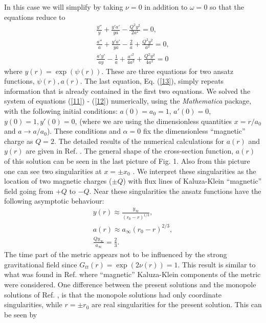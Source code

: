 In this case we will simplify by taking $\nu = 0$ in addition to
$\omega =0$ so that the equations reduce to
\begin{eqnarray} 
\frac{y''}{y} + \frac{y'a'}{ya} - \frac{Q^2 y^2}{2a^2} = 0, 
\label{11} \\
\frac{a''}{a} + \frac{y'a'}{ya} - \frac{2}{a} + 
\frac{Q^2 y^2}{a^2} = 0, 
\label{12} \\
\frac{a'y'}{ay} - \frac{1}{a} + \frac{a'^2}{4a^2} + 
\frac{Q^2y^2}{4a^2} = 0 
\label{13} 
\end{eqnarray} 
where $y(r)=\exp{(\psi(r))}$. These are three equations for two
ansatz functions, $\psi (r) , a(r)$. The last equation, Eq. (\ref{13}),
simply repeats information that is already contained in the
first two equations. We solved the system of equations 
(\ref{11}) - (\ref{12}) numerically, using the {\it Mathematica}
package, with the following initial conditions: 
$a(0) = a_0 = 1$, $a'(0) = 0$, $y(0) = 1, y'(0) = 0$, 
(where we are using the dimensionless quantities 
$x=r/a_0$ and $a \rightarrow a/a_0$). These conditions
and $\alpha = 0$ fix the dimensionless ``magnetic'' charge as 
$Q =  2$. The detailed results of the numerical calculations 
for $a(r)$ and $y(r)$ are given in Ref. \cite{dzhds}. The
general shape of the cross-section function, $a(r)$ of this
solution can be seen in the last picture of Fig. 1.
Also from this picture one can see two singularities at $x= \pm x_0$ .
We interpret these singularities as the 
location of two magnetic charges ($\pm Q$) 
with flux lines of Kaluza-Klein ``magnetic'' 
field going from $+Q$ to $-Q$.
Near these singularities the ansatz
functions have the following asymptotic behaviour: 
\begin{eqnarray} 
y(r) \approx \frac{y_{\infty}}{(r_0 - r)^{1/3}}, 
\label{14} \\
a(r) \approx a_\infty (r_0 - r)^{2/3}, 
\label{15} \\
\frac{Q y_\infty}{a_\infty} = \frac{2}{3}. 
\label{16} 
\end{eqnarray} 
The time part of the metric appears 
not to be influenced by the strong gravitational field since 
$G_{tt}(r) = \exp{(2\nu (r))} = 1$. This result is similar
to what was found in Ref. \cite{gross} \cite{sorkin} where ``magnetic''  
Kaluza-Klein components of the metric were considered. One difference
between the present solutions and the monopole solutions of Ref.
\cite{gross} \cite{sorkin}, is that the monopole solutions had
only coordinate singularities, while $r=\pm r_0$ are real
singularities for the present solution. This can be seen by 
